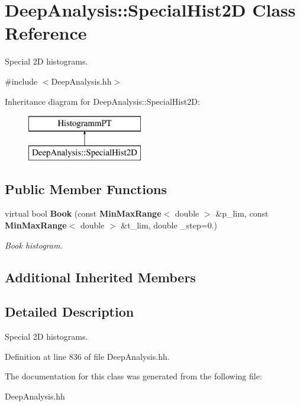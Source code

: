 \section{Deep\-Analysis\-:\-:Special\-Hist2\-D Class Reference}
\label{classDeepAnalysis_1_1SpecialHist2D}


Special 2\-D histograms.  




{\ttfamily \#include $<$Deep\-Analysis.\-hh$>$}

Inheritance diagram for Deep\-Analysis\-:\-:Special\-Hist2\-D\-:\begin{figure}[H]
\begin{center}
\leavevmode
\includegraphics[height=2.000000cm]{classDeepAnalysis_1_1SpecialHist2D}
\end{center}
\end{figure}
\subsection*{Public Member Functions}
\begin{DoxyCompactItemize}
\item 
virtual bool {\bf Book} (const {\bf Min\-Max\-Range}$<$ double $>$ \&p\-\_\-lim, const {\bf Min\-Max\-Range}$<$ double $>$ \&t\-\_\-lim, double \-\_\-step=0.)\label{classDeepAnalysis_1_1SpecialHist2D_a4e0ed25d3a28a50145c229cac8732836}

\begin{DoxyCompactList}\small\item\em Book histogram. \end{DoxyCompactList}\end{DoxyCompactItemize}
\subsection*{Additional Inherited Members}


\subsection{Detailed Description}
Special 2\-D histograms. 

Definition at line 836 of file Deep\-Analysis.\-hh.



The documentation for this class was generated from the following file\-:\begin{DoxyCompactItemize}
\item 
Deep\-Analysis.\-hh\end{DoxyCompactItemize}
